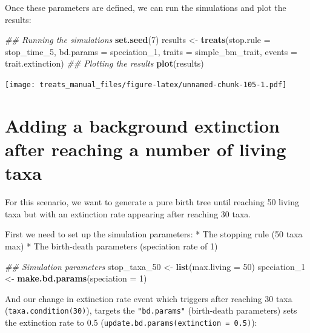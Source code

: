 \documentclass[
]{book}
\newenvironment{Shaded}{\begin{snugshade}}{\end{snugshade}}
\newcommand{\CommentTok}[1]{\textcolor[rgb]{0.56,0.35,0.01}{\textit{#1}}}
\newcommand{\DataTypeTok}[1]{\textcolor[rgb]{0.13,0.29,0.53}{#1}}
\newcommand{\DecValTok}[1]{\textcolor[rgb]{0.00,0.00,0.81}{#1}}
\newcommand{\KeywordTok}[1]{\textcolor[rgb]{0.13,0.29,0.53}{\textbf{#1}}}
\newcommand{\NormalTok}[1]{#1}
\newcommand{\StringTok}[1]{\textcolor[rgb]{0.31,0.60,0.02}{#1}}
\begin{document}
Once these parameters are defined, we can run the simulations and plot the results:

\begin{Shaded}
\begin{Highlighting}[]
\CommentTok{\#\# Running the simulations}
\KeywordTok{set.seed}\NormalTok{(}\DecValTok{7}\NormalTok{)}
\NormalTok{results \textless{}{-}}\StringTok{ }\KeywordTok{treats}\NormalTok{(}\DataTypeTok{stop.rule =}\NormalTok{ stop\_time\_}\DecValTok{5}\NormalTok{,}
                \DataTypeTok{bd.params =}\NormalTok{ speciation\_}\DecValTok{1}\NormalTok{,}
                \DataTypeTok{traits    =}\NormalTok{ simple\_bm\_trait,}
                \DataTypeTok{events    =}\NormalTok{ trait.extinction)}
\CommentTok{\#\# Plotting the results}
\KeywordTok{plot}\NormalTok{(results)}
\end{Highlighting}
\end{Shaded}

\texttt{[image: treats\_manual\_files/figure-latex/unnamed-chunk-105-1.pdf]}

\hypertarget{EGbg_ext}{%
\section{Adding a background extinction after reaching a number of living taxa}\label{EGbg_ext}}

For this scenario, we want to generate a pure birth tree until reaching 50 living taxa but with an extinction rate appearing after reaching 30 taxa.

First we need to set up the simulation parameters:
* The stopping rule (50 taxa max)
* The birth-death parameters (speciation rate of 1)

\begin{Shaded}
\begin{Highlighting}[]
\CommentTok{\#\# Simulation parameters}
\NormalTok{stop\_taxa\_}\DecValTok{50}\NormalTok{ \textless{}{-}}\StringTok{ }\KeywordTok{list}\NormalTok{(}\DataTypeTok{max.living =} \DecValTok{50}\NormalTok{)}
\NormalTok{speciation\_}\DecValTok{1}\NormalTok{ \textless{}{-}}\StringTok{ }\KeywordTok{make.bd.params}\NormalTok{(}\DataTypeTok{speciation =} \DecValTok{1}\NormalTok{)}
\end{Highlighting}
\end{Shaded}

And our change in extinction rate event which triggers after reaching 30 taxa (\texttt{taxa.condition(30)}), targets the \texttt{"bd.params"} (birth-death parameters) sets the extinction rate to 0.5 (\texttt{update.bd.params(extinction\ =\ 0.5)}):
\end{document}
